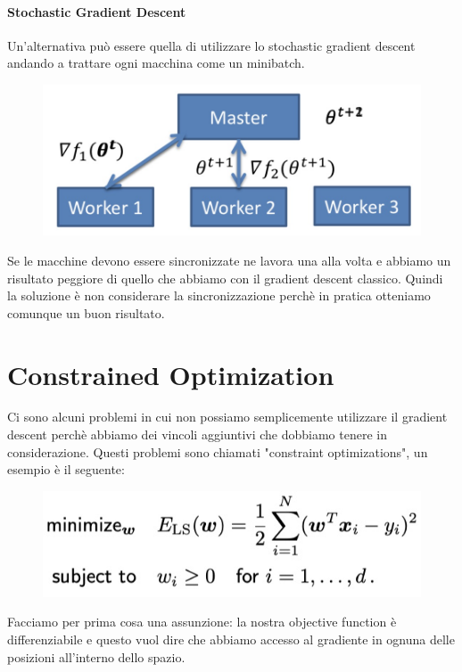 \documentclass[14pt]{extreport}
\begin{document}
\subsubsection{Stochastic Gradient Descent}

Un'alternativa può essere quella di utilizzare lo stochastic gradient descent andando a trattare ogni macchina come un minibatch.

\begin{figure}[H]
\centering
\includegraphics[width=0.7\linewidth]{274.jpeg}
\end{figure}

Se le macchine devono essere sincronizzate ne lavora una alla volta e abbiamo un risultato peggiore di quello che abbiamo con il gradient descent
classico. Quindi la soluzione è non considerare la sincronizzazione perchè in pratica otteniamo comunque un buon risultato.



\chapter{Constrained Optimization}

Ci sono alcuni problemi in cui non possiamo semplicemente utilizzare il gradient descent perchè abbiamo dei vincoli aggiuntivi che dobbiamo tenere in
considerazione. Questi problemi sono chiamati "constraint optimizations", un esempio è il seguente:

\begin{figure}[H]
\centering
\includegraphics[width=0.5\linewidth]{275.jpeg}
\end{figure}

Facciamo per prima cosa una assunzione: la nostra objective function è differenziabile e questo vuol dire che abbiamo accesso al gradiente in ognuna
delle posizioni all'interno dello spazio.
\end{document}
